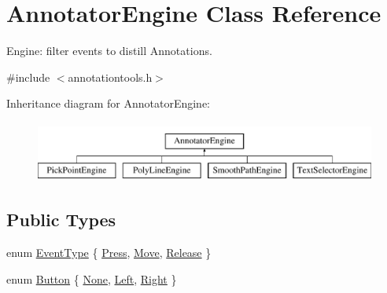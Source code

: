 \hypertarget{classAnnotatorEngine}{\section{Annotator\+Engine Class Reference}
\label{classAnnotatorEngine}
}


Engine\+: filter events to distill Annotations.  




{\ttfamily \#include $<$annotationtools.\+h$>$}

Inheritance diagram for Annotator\+Engine\+:\begin{figure}[H]
\begin{center}
\leavevmode
\includegraphics[height=2.000000cm]{classAnnotatorEngine}
\end{center}
\end{figure}
\subsection*{Public Types}
\begin{DoxyCompactItemize}
\item 
enum \hyperlink{classAnnotatorEngine_a00fb22eb4cb6eafb056f9066031db133}{Event\+Type} \{ \hyperlink{classAnnotatorEngine_a00fb22eb4cb6eafb056f9066031db133a7f6f77a85d31dc6afd375db9a53d5069}{Press}, 
\hyperlink{classAnnotatorEngine_a00fb22eb4cb6eafb056f9066031db133a4efcf099c4a82b1eab7de0fb124563a8}{Move}, 
\hyperlink{classAnnotatorEngine_a00fb22eb4cb6eafb056f9066031db133ac80dbad38d0461d9e546aa694c2abc1c}{Release}
 \}
\item 
enum \hyperlink{classAnnotatorEngine_ac2e3b75e12bacbb6974d15dd53954567}{Button} \{ \hyperlink{classAnnotatorEngine_ac2e3b75e12bacbb6974d15dd53954567aad36f3f65ac99d40e03cf36b3d65d018}{None}, 
\hyperlink{classAnnotatorEngine_ac2e3b75e12bacbb6974d15dd53954567a2719e853d63982d67e9d8aae3620178c}{Left}, 
\hyperlink{classAnnotatorEngine_ac2e3b75e12bacbb6974d15dd53954567a8c25b27f7e32e09ea9767d465de328a9}{Right}
 \}
\end{DoxyCompactItemize}
